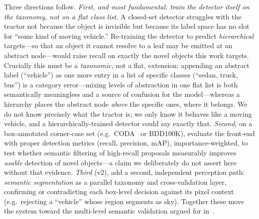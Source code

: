 \documentclass[conference]{IEEEtran}
\begin{document}
Three directions follow. \emph{First, and most fundamental: train the detector
itself on the taxonomy, not on a flat class list.} A closed-set detector
struggles with the tractor not because the object is invisible but because its
label space has no slot for ``some kind of moving vehicle.'' Re-training the
detector to predict \emph{hierarchical} targets---so that an object it cannot
resolve to a leaf may be emitted at an abstract node---would raise recall on
exactly the novel objects this work targets. Crucially this must be a
\emph{taxonomic}, not a flat, extension: appending an abstract label
(``vehicle'') as one more entry in a list of specific classes (``sedan, truck,
bus'') is a category error---mixing levels of abstraction in one flat list is
both semantically meaningless and a source of confusion for the model---whereas a
hierarchy places the abstract node \emph{above} the specific ones, where it
belongs. We do not know precisely what the tractor is; we only know it behaves
like a moving vehicle, and a hierarchically-trained detector could say exactly
that. \emph{Second}, on a box-annotated corner-case set (e.g.\ CODA~\cite{li2022}
or BDD100K), evaluate the front-end with proper detection metrics (recall,
precision, mAP), importance-weighted, to test whether semantic filtering of
high-recall proposals measurably improves \emph{usable} detection of novel
objects---a claim we deliberately do not assert here without that evidence.
\emph{Third} (v2), add a second, independent perception path: \emph{semantic
segmentation} as a parallel taxonomy and cross-validation layer, confirming or
contradicting each box-level decision against its pixel context (e.g.\ rejecting
a ``vehicle'' whose region segments as sky). Together these move the system
toward the multi-level semantic validation argued for in~\cite{schaller2025}.
\end{document}
